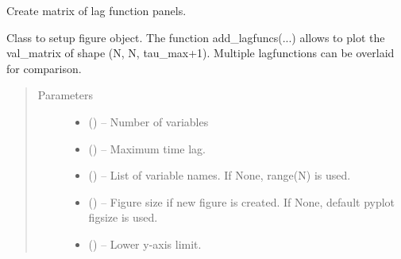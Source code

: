 \documentclass[letterpaper,10pt,english]{sphinxmanual}
\begin{document}
\begin{fulllineitems}
\label{\detokenize{index:tigramite.plotting.setup_matrix}}
Create matrix of lag function panels.

Class to setup figure object. The function add\_lagfuncs(...) allows to plot
the val\_matrix of shape (N, N, tau\_max+1). Multiple lagfunctions can be
overlaid for comparison.
\begin{quote}\begin{description}
\item[{Parameters}] \leavevmode\begin{itemize}
\item {} 
 () -- Number of variables

\item {} 
 () -- Maximum time lag.

\item {} 
 (\sphinxstyleliteralemphasis{, }\sphinxstyleliteralemphasis{ (}\sphinxstyleliteralemphasis{)}\sphinxstyleliteralemphasis{}) -- List of variable names. If None, range(N) is used.

\item {} 
 (\sphinxstyleliteralemphasis{, }\sphinxstyleliteralemphasis{ (}\sphinxstyleliteralemphasis{)}\sphinxstyleliteralemphasis{}) -- Figure size if new figure is created. If None, default pyplot figsize
is used.

\item {} 
 (\sphinxstyleliteralemphasis{, }\sphinxstyleliteralemphasis{ (}\sphinxstyleliteralemphasis{)}\sphinxstyleliteralemphasis{}) -- Lower y-axis limit.


\end{itemize}
\end{description}
\end{quote}
\end{fulllineitems}
\end{document}
